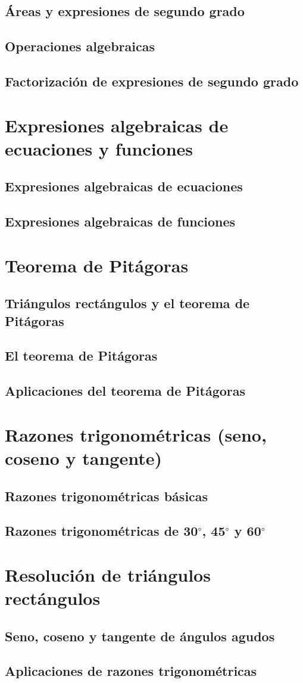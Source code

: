 \documentclass[11pt]{book}
\begin{document}
\subsection{Áreas y expresiones de segundo grado}
\subsection{Operaciones algebraicas}
\subsection{Factorización de expresiones de segundo grado}

\section{Expresiones algebraicas de ecuaciones y funciones}
\subsection{Expresiones algebraicas de ecuaciones}
\subsection{Expresiones algebraicas de funciones}

\section{Teorema de Pitágoras}
\subsection{Triángulos rectángulos y el teorema de Pitágoras}
\subsection{El teorema de Pitágoras}
\subsection{Aplicaciones del teorema de Pitágoras}

\section{Razones trigonométricas (seno, coseno y tangente)}
\subsection{Razones trigonométricas básicas}
\subsection{Razones trigonométricas de 30$^{\circ}$, 45$^{\circ}$ y 60$^{\circ}$}

\section{Resolución de triángulos rectángulos}
\subsection{Seno, coseno y tangente de ángulos agudos}
\subsection{Aplicaciones de razones trigonométricas}
\end{document}
